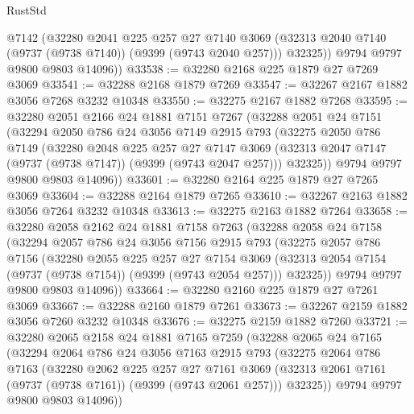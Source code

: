 \begin{lexlean}{RustStd}
\begin{coremodule}
          @7142
          (@32280
            @2041
            @225
            @257
            @27
            @7140
            @3069
            (@32313 @2040 @7140 (@9737 (@9738 @7140)) (@9399 (@9743 @2040 @257)))
            @32325))
        @9794
        @9797
        @9800
        @9803
        @14096))
@33538 := @32280 @2168 @225 @1879 @27 @7269 @3069
@33541 := @32288 @2168 @1879 @7269
@33547 := @32267 @2167 @1882 @3056 @7268 @3232 @10348
@33550 := @32275 @2167 @1882 @7268
@33595 := @32280
    @2051
    @2166
    @24
    @1881
    @7151
    @7267
    (@32288
      @2051
      @24
      @7151
      (@32294
        @2050
        @786
        @24
        @3056
        @7149
        @2915
        @793
        (@32275
          @2050
          @786
          @7149
          (@32280
            @2048
            @225
            @257
            @27
            @7147
            @3069
            (@32313 @2047 @7147 (@9737 (@9738 @7147)) (@9399 (@9743 @2047 @257)))
            @32325))
        @9794
        @9797
        @9800
        @9803
        @14096))
@33601 := @32280 @2164 @225 @1879 @27 @7265 @3069
@33604 := @32288 @2164 @1879 @7265
@33610 := @32267 @2163 @1882 @3056 @7264 @3232 @10348
@33613 := @32275 @2163 @1882 @7264
@33658 := @32280
    @2058
    @2162
    @24
    @1881
    @7158
    @7263
    (@32288
      @2058
      @24
      @7158
      (@32294
        @2057
        @786
        @24
        @3056
        @7156
        @2915
        @793
        (@32275
          @2057
          @786
          @7156
          (@32280
            @2055
            @225
            @257
            @27
            @7154
            @3069
            (@32313 @2054 @7154 (@9737 (@9738 @7154)) (@9399 (@9743 @2054 @257)))
            @32325))
        @9794
        @9797
        @9800
        @9803
        @14096))
@33664 := @32280 @2160 @225 @1879 @27 @7261 @3069
@33667 := @32288 @2160 @1879 @7261
@33673 := @32267 @2159 @1882 @3056 @7260 @3232 @10348
@33676 := @32275 @2159 @1882 @7260
@33721 := @32280
    @2065
    @2158
    @24
    @1881
    @7165
    @7259
    (@32288
      @2065
      @24
      @7165
      (@32294
        @2064
        @786
        @24
        @3056
        @7163
        @2915
        @793
        (@32275
          @2064
          @786
          @7163
          (@32280
            @2062
            @225
            @257
            @27
            @7161
            @3069
            (@32313 @2061 @7161 (@9737 (@9738 @7161)) (@9399 (@9743 @2061 @257)))
            @32325))
        @9794
        @9797
        @9800
        @9803
        @14096))

\end{coremodule}
\end{lexlean}
